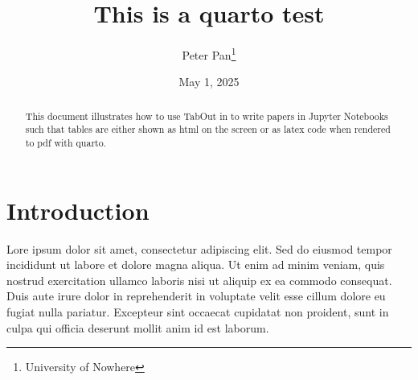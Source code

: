 \documentclass[
  11pt,
  a4paper,
  DIV=11,
  numbers=noendperiod]{scrartcl}
\title{This is a quarto test}
\author{Peter Pan\footnote{University of Nowhere}}
\date{May 1, 2025}
\begin{document}
\maketitle
\begin{abstract}
This document illustrates how to use TabOut in to write papers in
Jupyter Notebooks such that tables are either shown as html on the
screen or as latex code when rendered to pdf with quarto. \newpage
\end{abstract}


\onehalfspacing

\section{Introduction}\label{introduction}

Lore ipsum dolor sit amet, consectetur adipiscing elit. Sed do eiusmod
tempor incididunt ut labore et dolore magna aliqua. Ut enim ad minim
veniam, quis nostrud exercitation ullamco laboris nisi ut aliquip ex ea
commodo consequat. Duis aute irure dolor in reprehenderit in voluptate
velit esse cillum dolore eu fugiat nulla pariatur. Excepteur sint
occaecat cupidatat non proident, sunt in culpa qui officia deserunt
mollit anim id est laborum.
\end{document}
